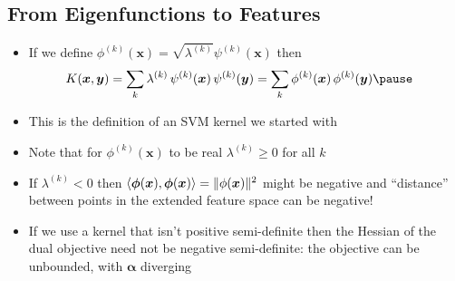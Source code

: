 \begin{slide}
\section[-2]{From Eigenfunctions to Features}

\begin{PauseHighLight}
  \begin{itemize}
  \item If we define $\phi^{(k)}(\bm{x}) = \sqrt{\lambda^{(k)}} \psi^{(k)}(\bm{x})$
    then
    \begin{align*}
      K(\bm{x}, \bm{y}) &= \sum_k \lambda^{(k)}\,
      \psi^{(k)}(\bm{x})\,\psi^{(k)}(\bm{y})
      = \sum_k \phi^{(k)}(\bm{x})\,\phi^{(k)}(\bm{y})\pause
    \end{align*}
  \item This is the definition of an SVM kernel we started with\pause
  \item Note that for $\phi^{(k)}(\bm{x})$ to be real $\lambda^{(k)}\geq 0$ for
    all $k$\pause
  \item If $\lambda^{(k)} < 0$ then $\langle \bm{\phi}(\bm{x}),
    \bm{\phi}(\bm{x}) \rangle = \| \phi(\bm{x}) \|^2$ might be
    negative and  ``distance'' between points in the
    extended feature space can be negative!\pause
  \item If we use a kernel that isn't positive semi-definite then the
    Hessian of the dual objective need not be negative
    semi-definite: the objective can be unbounded, with $\bm{\alpha}$
    diverging\pause
  \end{itemize}
\end{PauseHighLight}

\end{slide}

\Outline %

